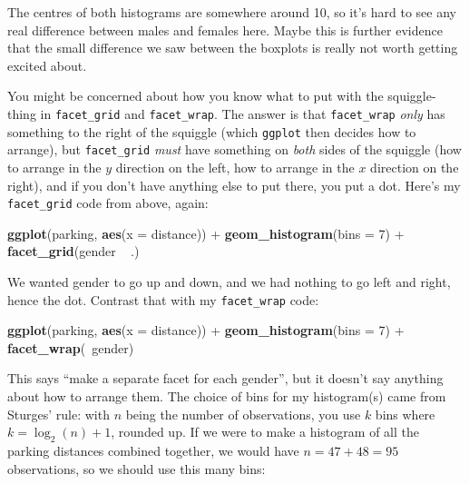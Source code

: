 \documentclass[]{tufte-book}
\newenvironment{Shaded}{}{}
\newcommand{\DataTypeTok}[1]{\textcolor[rgb]{0.56,0.13,0.00}{#1}}
\newcommand{\DecValTok}[1]{\textcolor[rgb]{0.25,0.63,0.44}{#1}}
\newcommand{\KeywordTok}[1]{\textcolor[rgb]{0.00,0.44,0.13}{\textbf{#1}}}
\newcommand{\NormalTok}[1]{#1}
\newcommand{\OperatorTok}[1]{\textcolor[rgb]{0.40,0.40,0.40}{#1}}
\newcommand{\StringTok}[1]{\textcolor[rgb]{0.25,0.44,0.63}{#1}}
\theoremstyle{definition}
\theoremstyle{definition}
\theoremstyle{definition}
\theoremstyle{remark}
\begin{document}
The centres of both histograms are somewhere around 10, so it's hard to
see any real difference between males and females here. Maybe this is
further evidence that the small difference we saw between the boxplots
is really not worth getting excited about.

You might be concerned about how you know what to put with the
squiggle-thing in \texttt{facet\_grid} and \texttt{facet\_wrap}. The
answer is that \texttt{facet\_wrap} \emph{only} has something to the
right of the squiggle (which \texttt{ggplot} then decides how to
arrange), but \texttt{facet\_grid} \emph{must} have something on
\emph{both} sides of the squiggle (how to arrange in the \(y\) direction
on the left, how to arrange in the \(x\) direction on the right), and if
you don't have anything else to put there, you put a dot. Here's my
\texttt{facet\_grid} code from above, again:

\begin{Shaded}
\begin{Highlighting}[]
\KeywordTok{ggplot}\NormalTok{(parking, }\KeywordTok{aes}\NormalTok{(}\DataTypeTok{x =}\NormalTok{ distance)) }\OperatorTok{+}\StringTok{ }\KeywordTok{geom_histogram}\NormalTok{(}\DataTypeTok{bins =} \DecValTok{7}\NormalTok{) }\OperatorTok{+}\StringTok{ }
\StringTok{    }\KeywordTok{facet_grid}\NormalTok{(gender }\OperatorTok{~}\StringTok{ }\NormalTok{.)}
\end{Highlighting}
\end{Shaded}

We wanted gender to go up and down, and we had nothing to go left and
right, hence the dot. Contrast that with my \texttt{facet\_wrap} code:

\begin{Shaded}
\begin{Highlighting}[]
\KeywordTok{ggplot}\NormalTok{(parking, }\KeywordTok{aes}\NormalTok{(}\DataTypeTok{x =}\NormalTok{ distance)) }\OperatorTok{+}\StringTok{ }\KeywordTok{geom_histogram}\NormalTok{(}\DataTypeTok{bins =} \DecValTok{7}\NormalTok{) }\OperatorTok{+}\StringTok{ }
\StringTok{    }\KeywordTok{facet_wrap}\NormalTok{(}\OperatorTok{~}\NormalTok{gender)}
\end{Highlighting}
\end{Shaded}

This says ``make a separate facet for each gender'', but it doesn't say
anything about how to arrange them. The choice of bins for my
histogram(s) came from Sturges' rule: with \(n\) being the number of
observations, you use \(k\) bins where \(k=\log_2(n)+1\), rounded up. If
we were to make a histogram of all the parking distances combined
together, we would have \(n=47+48=95\) observations, so we should use
this many bins:
\end{document}
